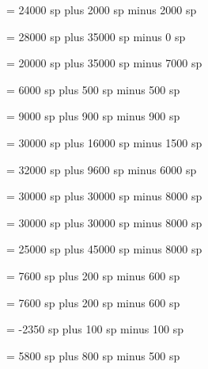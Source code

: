 \newskip\glyphspace
\glyphspace = 24000 sp plus 2000 sp minus 2000 sp%

\newskip\intersyllablespace
\intersyllablespace= 28000 sp plus 35000 sp minus 0 sp%

\newskip\spacebeforecusto
\spacebeforecusto = 20000 sp plus 35000 sp minus 7000 sp%

\newskip\spacebeforesigns
\spacebeforesigns= 6000 sp plus 500 sp minus 500 sp%

\newskip\spaceaftersigns
\spaceaftersigns= 9000 sp plus 900 sp minus 900 sp%

\newskip\spaceafterlineclef
\spaceafterlineclef = 30000 sp plus 16000 sp minus 1500 sp%

\newskip\interwordspacenotes
\interwordspacenotes = 32000 sp plus 9600 sp minus 6000 sp%

\newskip\interwordspacenotestext
\interwordspacenotestext = 30000 sp plus 30000 sp minus 8000 sp%

\newskip\interwordspacetextnotes
\interwordspacetextnotes = 30000 sp plus 30000 sp minus 8000 sp%

\newskip\interwordspacetext
\interwordspacetext = 25000 sp plus 45000 sp minus 8000 sp%

\newskip\bitrivirspace
\bitrivirspace = 7600 sp plus 200 sp minus 600 sp%

\newskip\bitristrospace
\bitristrospace = 7600 sp plus 200 sp minus 600 sp%

\newskip\punctuminclinatumshift
\punctuminclinatumshift= -2350 sp plus 100 sp minus 100 sp%

\newskip\beforepunctainclinatashift
\beforepunctainclinatashift= 5800 sp plus 800 sp minus 500 sp%

